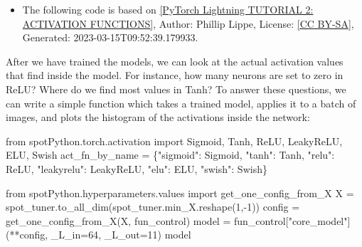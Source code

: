 \documentclass[
  letterpaper,
  DIV=11,
  numbers=noendperiod]{scrreprt}
\newenvironment{Shaded}{\begin{snugshade}}{\end{snugshade}}
\newcommand{\DecValTok}[1]{\textcolor[rgb]{0.68,0.00,0.00}{#1}}
\newcommand{\ImportTok}[1]{\textcolor[rgb]{0.00,0.46,0.62}{#1}}
\newcommand{\NormalTok}[1]{\textcolor[rgb]{0.00,0.23,0.31}{#1}}
\newcommand{\OperatorTok}[1]{\textcolor[rgb]{0.37,0.37,0.37}{#1}}
\newcommand{\StringTok}[1]{\textcolor[rgb]{0.13,0.47,0.30}{#1}}
\providecommand{\tightlist}{%
  \setlength{\itemsep}{0pt}\setlength{\parskip}{0pt}}\usepackage{longtable,booktabs,array}
\begin{document}
\begin{tcolorbox}[enhanced jigsaw, coltitle=black, bottomrule=.15mm, breakable, toprule=.15mm, colframe=quarto-callout-note-color-frame, title=\textcolor{quarto-callout-note-color}{\faInfo}\hspace{0.5em}{Reference:}, colbacktitle=quarto-callout-note-color!10!white, opacityback=0, left=2mm, leftrule=.75mm, colback=white, rightrule=.15mm, bottomtitle=1mm, toptitle=1mm, titlerule=0mm, arc=.35mm, opacitybacktitle=0.6]

\begin{itemize}
\tightlist
\item
  The following code is based on
  \href{https://lightning.ai/docs/pytorch/stable/notebooks/course_UvA-DL/02-activation-functions.html}{{[}PyTorch
  Lightning TUTORIAL 2: ACTIVATION FUNCTIONS{]}}, Author: Phillip Lippe,
  License: \href{https://creativecommons.org/licenses/by-sa/3.0/}{{[}CC
  BY-SA{]}}, Generated: 2023-03-15T09:52:39.179933.
\end{itemize}

\end{tcolorbox}

After we have trained the models, we can look at the actual activation
values that find inside the model. For instance, how many neurons are
set to zero in ReLU? Where do we find most values in Tanh? To answer
these questions, we can write a simple function which takes a trained
model, applies it to a batch of images, and plots the histogram of the
activations inside the network:

\begin{Shaded}
\begin{Highlighting}[]
\ImportTok{from}\NormalTok{ spotPython.torch.activation }\ImportTok{import}\NormalTok{ Sigmoid, Tanh, ReLU, LeakyReLU, ELU, Swish}
\NormalTok{act\_fn\_by\_name }\OperatorTok{=}\NormalTok{ \{}\StringTok{"sigmoid"}\NormalTok{: Sigmoid, }\StringTok{"tanh"}\NormalTok{: Tanh, }\StringTok{"relu"}\NormalTok{: ReLU, }\StringTok{"leakyrelu"}\NormalTok{: LeakyReLU, }\StringTok{"elu"}\NormalTok{: ELU, }\StringTok{"swish"}\NormalTok{: Swish\}}
\end{Highlighting}
\end{Shaded}

\begin{Shaded}
\begin{Highlighting}[]
\ImportTok{from}\NormalTok{ spotPython.hyperparameters.values }\ImportTok{import}\NormalTok{ get\_one\_config\_from\_X}
\NormalTok{X }\OperatorTok{=}\NormalTok{ spot\_tuner.to\_all\_dim(spot\_tuner.min\_X.reshape(}\DecValTok{1}\NormalTok{,}\OperatorTok{{-}}\DecValTok{1}\NormalTok{))}
\NormalTok{config }\OperatorTok{=}\NormalTok{ get\_one\_config\_from\_X(X, fun\_control)}
\NormalTok{model }\OperatorTok{=}\NormalTok{ fun\_control[}\StringTok{"core\_model"}\NormalTok{](}\OperatorTok{**}\NormalTok{config, \_L\_in}\OperatorTok{=}\DecValTok{64}\NormalTok{, \_L\_out}\OperatorTok{=}\DecValTok{11}\NormalTok{)}
\NormalTok{model}
\end{Highlighting}
\end{Shaded}
\end{document}
